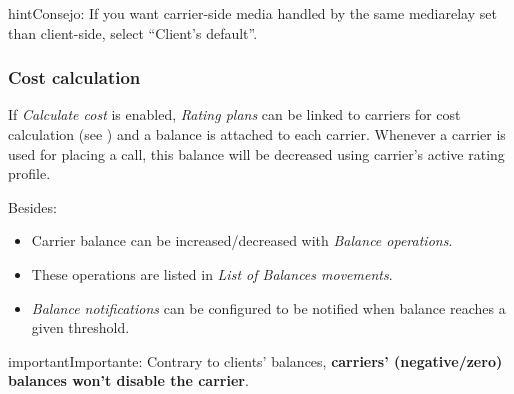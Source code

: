 \documentclass[letterpaper,10pt,spanish]{sphinxmanual}
\begin{document}
\begin{notice}{hint}{Consejo:}
If you want carrier-side media handled by the same mediarelay set than client-side, select ``Client's default''.
\end{notice}


\subsubsection{Cost calculation}
\label{administration_portal/brand/providers/carriers:cost-calculation}\label{administration_portal/brand/providers/carriers:id2}
If \emph{Calculate cost} is enabled, \emph{Rating plans} can be linked to carriers for cost calculation (see
{\hyperref[administration_portal/brand/billing/rating_plans:assigning\string-rating\string-plans\string-to\string-carriers]{}}) and a balance is attached to each carrier. Whenever a carrier is used for
placing a call, this balance will be decreased using carrier's active rating profile.

Besides:
\begin{itemize}
\item {} 
Carrier balance can be increased/decreased with \emph{Balance operations}.

\item {} 
These operations are listed in \emph{List of Balances movements}.

\item {} 
\emph{Balance notifications} can be configured to be notified when balance reaches a given threshold.

\end{itemize}

\begin{notice}{important}{Importante:}
Contrary to clients' balances, \textbf{carriers' (negative/zero) balances won't disable the carrier}.
\end{notice}
\end{document}
